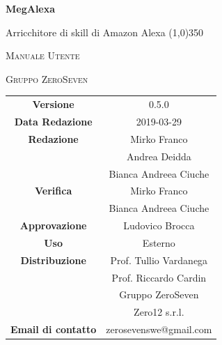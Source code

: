 \documentclass[a4paper,12pt,openany]{book}
\author{Ludovico Brocca}
\date{2018-12-19}
\begin{document}
\begin{titlepage}
	\centering
	{\huge\bfseries MegAlexa \par}
	Arricchitore di skill di Amazon Alexa
	\line(1,0){350} \\
	{\scshape\LARGE Manuale Utente \par}
	\vspace{1cm}
	{\scshape Gruppo ZeroSeven \par}
	\logo
	\begin{tabular}{c|c}
		{\hfill \textbf{Versione}} 			& 0.5.0	\\
		{\hfill\textbf{Data Redazione}} 	& 2019-03-29	\\ 
		{\hfill\textbf{Redazione}} 		& Mirko Franco \\ & Andrea Deidda \\& Bianca Andreea Ciuche \\
		{\hfill\textbf{Verifica}} 				&  	Mirko Franco \\ & Bianca Andreea Ciuche \\
		{\hfill\textbf{Approvazione}} 		&  Ludovico Brocca \\
		{\hfill\textbf{Uso}} 					& 		Esterno		\\ 
		{\hfill\textbf{Distribuzione}} 			& 			Prof. Tullio Vardanega \\ & Prof. Riccardo Cardin \\ & Gruppo ZeroSeven	\\ & Zero12 s.r.l. \\
		{\hfill\textbf{Email di contatto}} & zerosevenswe@gmail.com \\
	\end{tabular}
\end{titlepage}
	
	\label{LastFrontPage}
	\newpage	
	
	\pagestyle{mymain}
	\tableofcontents
	\listoffigures
	
	
	
	
	\appendix
	
	\label{LastPage}
\end{document}
